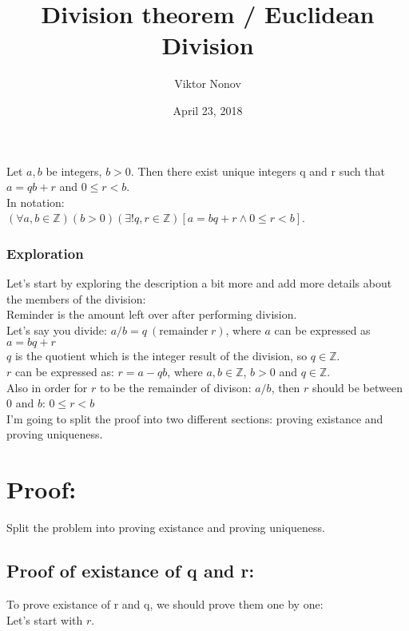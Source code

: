 \documentclass{article}
\title{Division theorem / Euclidean Division}
\author{Viktor Nonov}
\date{April 23, 2018}
\begin{document}
\maketitle

Let $a,b$ be integers, $b > 0$. Then there exist unique integers q and r such that $a = qb + r$ and $0 \leq r < b$.\\
In notation:\\
$(\forall a,b \in \mathbb{Z})(b > 0)(\exists! q,r \in \mathbb{Z})[a = bq + r \wedge 0 \leq r < b]$.\\

\subsubsection*{Exploration}
Let's start by exploring the description a bit more and add more details about the members of the division:\\
Reminder is the amount left over after performing division.\\
Let's say you divide: $a / b = q\ (\textrm{remainder}\ r)$, where $a$ can be expressed as $a = bq + r$\\
$q$ is the quotient which is the integer result of the division, so $q \in \mathbb{Z}$.\\
$r$ can be expressed as: $r = a - qb$, where $a, b \in \mathbb{Z}$, $b > 0$ and $q \in \mathbb{Z}$. \\
Also in order for $r$ to be the remainder of divison: $a / b$, then $r$ should be between 0 and $b$: $0 \leq r < b$\\
I'm going to split the proof into two different sections: proving existance and proving uniqueness.

\section*{Proof:}
Split the problem into proving existance and proving uniqueness.\\

\subsection*{Proof of existance of q and r:}
To prove existance of r and q, we should prove them one by one:\\
Let's start with $r$.
\end{document}
